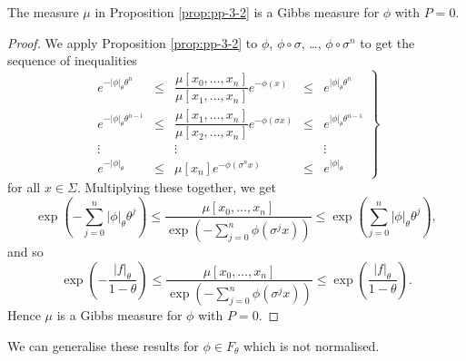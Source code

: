 \begin{corollary} \label{cor:pp-3-2-1}
	The measure $\mu$ in Proposition \ref{prop:pp-3-2} is a Gibbs measure for $\phi$ with $P = 0$.
	\begin{proof}
		We apply Proposition \ref{prop:pp-3-2} to $\phi$, $\phi \circ \sigma$, \dots, $\phi \circ \sigma^n$ to get the sequence of inequalities
		\[
			\left.
			\begin{matrix}
				e^{-|\phi|_\theta \theta^n} &\leq& \dfrac{\mu[x_0, \dots, x_n]}{\mu[x_1, \dots, x_n]} e^{-\phi(x)} &\leq& e^{|\phi|_\theta \theta^n} \\
				e^{-|\phi|_\theta \theta^{n - 1}} &\leq& \dfrac{\mu[x_1, \dots, x_n]}{\mu[x_2, \dots, x_n]} e^{-\phi(\sigma{x})} &\leq& e^{|\phi|_\theta \theta^{n - 1}} \\
				\vdots & & \vdots & & \vdots \\
				e^{-|\phi|_\theta} &\leq& \mu[x_n] e^{-\phi(\sigma^n{x})} &\leq& e^{|\phi|_\theta}
			\end{matrix}
			\right\}
		\]
		for all $x \in \Sigma$. Multiplying these together, we get
		\[
			\exp\left(-\sum_{j = 0}^n{|\phi|_\theta \theta^j}\right) \leq \frac{\mu[x_0, \dots, x_n]}{\exp\left(-\sum_{j = 0}^n{\phi(\sigma^j{x})}\right)} \leq \exp\left(\sum_{j = 0}^n{|\phi|_\theta \theta^j}\right),
		\]
		and so
		\[
			\exp\left(-\frac{|f|_\theta}{1 - \theta}\right) \leq \frac{\mu[x_0, \dots, x_n]}{\exp\left(-\sum_{j = 0}^n{\phi(\sigma^j{x})}\right)} \leq \exp\left(\frac{|f|_\theta}{1 - \theta}\right).
		\]
		Hence $\mu$ is a Gibbs measure for $\phi$ with $P = 0$.
	\end{proof}
\end{corollary}

We can generalise these results for $\phi \in F_\theta$ which is not normalised.

